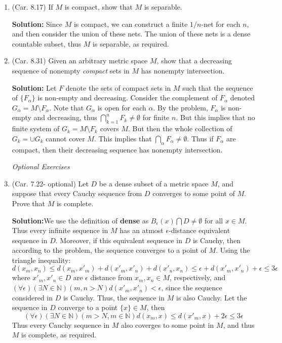 \documentclass{article}
\def\le{\leqslant}
\def\NN{\mathbb N}
\begin{document}
\begin{enumerate}

\item (Car. 8.17) If $M$ is compact, show that $M$ is separable.

\textbf{Solution:} Since $M$ is compact, we can construct a
finite $1/n$-net for each $n$, and then consider the union of these
nets. The union of these nets is a dense countable subset, thus $M$
is separable, as required.


\item (Car. 8.31) Given an arbitrary metric space $M$, show that a decreasing sequence of nonempty \textit{compact} sets in $M$ has nonempty intersection.

\textbf{Solution:} Let $F$ denote the sets of compact sets in $M$ such 
that the sequence of $\{F_\alpha\}$ is non-empty and decreasing. Consider
the complement of $F_\alpha$ denoted $G_\alpha=M\setminus F_\alpha$. 
Note that $G_\alpha$ is open for each $\alpha$. By the problem, $F_\alpha$ is
non-empty and decreasing, thus $\bigcap_{k=1}^n F_k \ne \emptyset$ for finite $n$.
But this implies that no finite system of 
$G_k=M\setminus F_k$ covers $M$. But then
the whole collection of $G_k = \cup G_k$ cannot cover $M$. This
implies that $\bigcap_\alpha F_\alpha \ne \emptyset$. Thus if $F_\alpha$ are compact,
then their decreasing sequence has nonempty intersection.


\begin{center}
\hrulefill  \quad \large{\textit{Optional Exercises}} \quad \hrulefill 
\end{center}


\item (Car. 7.22- optional) Let $D$ be a dense subset of a metric space $M$, and suppose that every Cauchy sequence from $D$ converges to some point of $M$. Prove that $M$ is complete.

\textbf{Solution:}We use the definition of \textbf{dense} as 
$B_\epsilon(x) \bigcap D \ne \emptyset$ for all $x \in M$. Thus every infinite 
sequence in $M$ has an atmost $\epsilon$-distance equivalent sequence in $D$.
Moreover, if this equivalent sequence in $D$ is Cauchy, then according to
the problem, the sequence converges to a point of $M$. Using the triangle
inequality:
\[
d(x_m,x_n) \le d(x_m,x'_m) + d(x'_m,x'_n) + d(x'_n,x_n) \le \epsilon + d(x'_m,x'_n) + \epsilon \le 3\epsilon
\]
where $x'_m,x'_n \in D$ are $\epsilon$ distance from $x_m,x_n \in M$, 
respectively, 
and $(\forall \epsilon)(\exists N\in\NN)(m,n > N)d(x'_m,x'_n)<\epsilon$, since
the sequence considered in $D$ is Cauchy. Thus, the sequence in $M$ is also
Cauchy.
Let the sequence in $D$ converge to a point $\{x\}\in M$, then
\[
(\forall \epsilon)(\exists N\in\NN)(m>N,m\in\NN) d(x_m,x) \le d(x'_m,x)+ 2\epsilon \le 3\epsilon
\]
Thus every Cauchy sequence in $M$ also coverges to
some point in $M$, and thus $M$ is complete, as required.


\end{enumerate}
\end{document}
